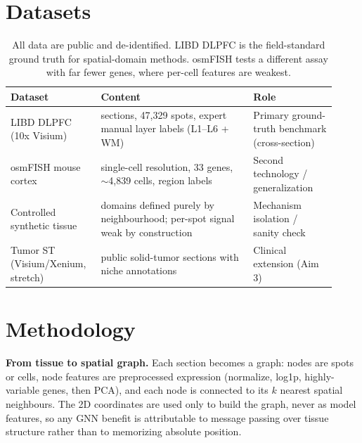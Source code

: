 \documentclass[11pt]{article}
\begin{document}
\section{Datasets}

\begin{table}[H]
\centering\small
\begin{tabular}{>{\raggedright\arraybackslash}p{0.24\linewidth} >{\raggedright\arraybackslash}p{0.44\linewidth} >{\raggedright\arraybackslash}p{0.24\linewidth}}
\toprule
\rowcolor{sriblue}\color{white}\textbf{Dataset} & \color{white}\textbf{Content} & \color{white}\textbf{Role}\\
\midrule
\rowcolor{srirow} LIBD DLPFC (10x Visium) \cite{maynard2021,pardo2022} & 12 sections, 47{,}329 spots, expert manual layer labels (L1--L6 + WM) & Primary ground-truth benchmark (cross-section)\\
osmFISH mouse cortex \cite{codeluppi2018} & single-cell resolution, 33 genes, $\sim$4{,}839 cells, region labels & Second technology / generalization\\
\rowcolor{srirow} Controlled synthetic tissue & domains defined purely by neighbourhood; per-spot signal weak by construction & Mechanism isolation / sanity check\\
Tumor ST (Visium/Xenium, stretch) & public solid-tumor sections with niche annotations & Clinical extension (Aim 3)\\
\bottomrule
\end{tabular}
\caption{All data are public and de-identified. LIBD DLPFC is the field-standard
ground truth for spatial-domain methods. osmFISH tests a different assay with far
fewer genes, where per-cell features are weakest.}
\label{tab:data}
\end{table}

\section{Methodology}

\textbf{From tissue to spatial graph.} Each section becomes a graph: nodes are
spots or cells, node features are preprocessed expression (normalize, log1p,
highly-variable genes, then PCA), and each node is connected to its $k$ nearest
spatial neighbours. The 2D coordinates are used only to build the graph, never as
model features, so any GNN benefit is attributable to message passing over tissue
structure rather than to memorizing absolute position.
\end{document}
